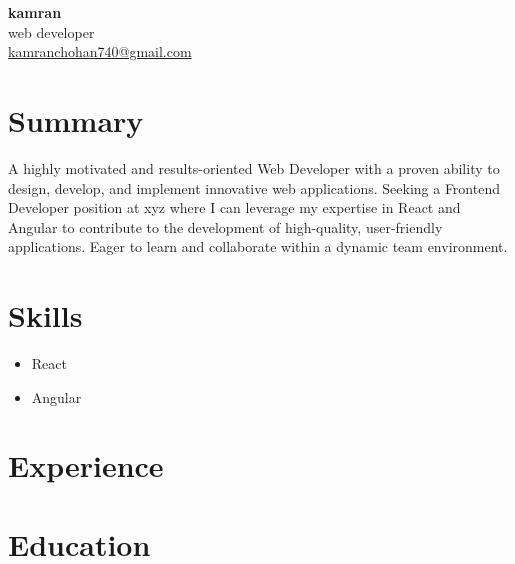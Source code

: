 \documentclass[11pt,a4paper]{article}
\begin{document}
\begin{center}
    {\Huge \textbf{kamran}} \\
    \vspace{0.2cm}
    {\large web developer} \\
    \vspace{0.3cm}
    \href{mailto:kamranchohan740@gmail.com}{kamranchohan740@gmail.com}
\end{center}

\vspace{0.5cm}

\section{Summary}
A highly motivated and results-oriented Web Developer with a proven ability to design, develop, and implement innovative web applications.  Seeking a Frontend Developer position at xyz where I can leverage my expertise in React and Angular to contribute to the development of high-quality, user-friendly applications.  Eager to learn and collaborate within a dynamic team environment.

\section{Skills}
\begin{itemize}
    \item React
    \item Angular
\end{itemize}

\section{Experience}


\section{Education}
\end{document}
